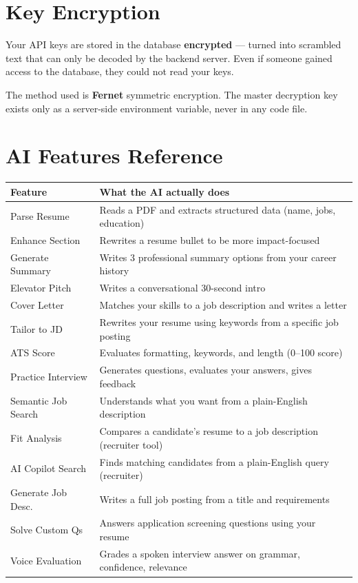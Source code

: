 \documentclass[12pt, a4paper]{report}
\begin{document}
\section{Key Encryption}

Your API keys are stored in the database \textbf{encrypted} --- turned into
scrambled text that can only be decoded by the backend server.  Even if someone
gained access to the database, they could not read your keys.

The method used is \textbf{Fernet} symmetric encryption.  The master decryption
key exists only as a server-side environment variable, never in any code file.

\section{AI Features Reference}

\begin{center}
{\small
\begin{tabularx}{\textwidth}{lX}
\toprule
\textbf{Feature} & \textbf{What the AI actually does} \\
\midrule
Parse Resume         & Reads a PDF and extracts structured data (name, jobs, education) \\
Enhance Section      & Rewrites a resume bullet to be more impact-focused \\
Generate Summary     & Writes 3 professional summary options from your career history \\
Elevator Pitch       & Writes a conversational 30-second intro \\
Cover Letter         & Matches your skills to a job description and writes a letter \\
Tailor to JD         & Rewrites your resume using keywords from a specific job posting \\
ATS Score            & Evaluates formatting, keywords, and length (0--100 score) \\
Practice Interview   & Generates questions, evaluates your answers, gives feedback \\
Semantic Job Search  & Understands what you want from a plain-English description \\
Fit Analysis         & Compares a candidate's resume to a job description (recruiter tool) \\
AI Copilot Search    & Finds matching candidates from a plain-English query (recruiter) \\
Generate Job Desc.   & Writes a full job posting from a title and requirements \\
Solve Custom Qs      & Answers application screening questions using your resume \\
Voice Evaluation     & Grades a spoken interview answer on grammar, confidence, relevance \\
\bottomrule
\end{tabularx}
}
\end{center}
\end{document}
